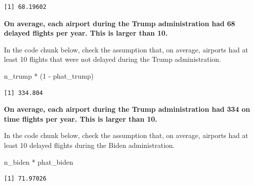 \documentclass[
  letterpaper,
  DIV=11,
  numbers=noendperiod]{scrartcl}
\newenvironment{Shaded}{\begin{snugshade}}{\end{snugshade}}
\newcommand{\DecValTok}[1]{\textcolor[rgb]{0.68,0.00,0.00}{#1}}
\newcommand{\NormalTok}[1]{\textcolor[rgb]{0.00,0.23,0.31}{#1}}
\newcommand{\SpecialCharTok}[1]{\textcolor[rgb]{0.37,0.37,0.37}{#1}}
\begin{document}
\begin{verbatim}
[1] 68.19602
\end{verbatim}

\begin{tcolorbox}[enhanced jigsaw, toprule=.15mm, breakable, leftrule=.75mm, bottomrule=.15mm, rightrule=.15mm, colback=white, opacityback=0, colframe=quarto-callout-warning-color-frame, left=2mm, arc=.35mm]

\textbf{On average, each airport during the Trump administration had 68
delayed flights per year. This is larger than 10.}

\end{tcolorbox}

In the code chunk below, check the assumption that, on average, airports
had at least 10 flights that were not delayed during the Trump
administration.

\begin{Shaded}
\begin{Highlighting}[]
\NormalTok{n\_trump }\SpecialCharTok{*}\NormalTok{ (}\DecValTok{1} \SpecialCharTok{{-}}\NormalTok{ phat\_trump)}
\end{Highlighting}
\end{Shaded}

\begin{verbatim}
[1] 334.804
\end{verbatim}

\begin{tcolorbox}[enhanced jigsaw, toprule=.15mm, breakable, leftrule=.75mm, bottomrule=.15mm, rightrule=.15mm, colback=white, opacityback=0, colframe=quarto-callout-warning-color-frame, left=2mm, arc=.35mm]

\textbf{On average, each airport during the Trump administration had 334
on time flights per year. This is larger than 10.}

\end{tcolorbox}

In the code chunk below, check the assumption that, on average, airports
had at least 10 delayed flights during the Biden administration.

\begin{Shaded}
\begin{Highlighting}[]
\NormalTok{n\_biden }\SpecialCharTok{*}\NormalTok{ phat\_biden}
\end{Highlighting}
\end{Shaded}

\begin{verbatim}
[1] 71.97026
\end{verbatim}
\end{document}
